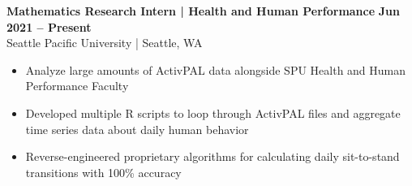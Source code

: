 \textbf{Mathematics Research Intern | Health and Human Performance} \hfill \textbf{Jun 2021 -- Present}\\
    Seattle Pacific University | Seattle, WA
    \squish
    \begin{itemize} \setlength\itemsep{-2pt}
        \item Analyze large amounts of ActivPAL data alongside SPU Health and Human Performance Faculty
        \item Developed multiple R scripts to loop through ActivPAL files and aggregate time series data about daily human behavior
        \item Reverse-engineered proprietary algorithms for calculating daily sit-to-stand transitions with 100\% accuracy
    \end{itemize}